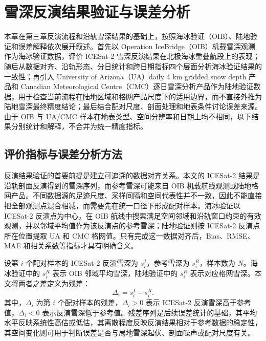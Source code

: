 \cleardoublepage

\section{雪深反演结果验证与误差分析}

本章在第三章反演流程和沿轨雪深结果的基础上，按照海冰验证（OIB）、陆地验证和误差解释依次展开叙述。首先以 Operation IceBridge（OIB）机载雪深观测作为海冰验证数据，评价 ICESat-2 雪深反演结果在北极海冰重叠航段上的表现；随后从数据对齐、沿轨形态、分日统计和跨日期指标四个层面分析海冰验证结果的一致性；再引入 University of Arizona（UA）daily 4 km gridded snow depth 产品和 Canadian Meteorological Centre（CMC）逐日雪深分析产品作为陆地验证数据，用于检查当前流程在陆地区域和格网产品尺度下的适用边界，而不直接外推为陆地雪深最终精度结论；最后结合配对尺度、剖面处理和地表条件讨论误差来源。由于 OIB 与 UA/CMC 样本在地表类型、空间分辨率和日期上均不相同，以下结果分别统计和解释，不合并为统一精度指标。

\subsection{评价指标与误差分析方法}

反演结果验证的首要前提是建立可追溯的数据对齐关系。本文的 ICESat-2 结果是沿轨剖面反演得到的雪深序列，而参考雪深可能来自 OIB 机载航线观测或陆地格网产品。不同数据源的足迹尺度、采样间隔和空间代表性并不一致，因此不能直接把全部观测点混合相减，而需要先在统一口径下形成配对样本。海冰验证以 ICESat-2 反演点为中心，在 OIB 航线中搜索满足空间邻域和沿轨窗口约束的有效观测，并以邻域平均值作为该反演点的参考雪深；陆地验证则按 ICESat-2 反演点所在位置提取 UA 和 CMC 格网值。只有完成这一数据对齐后，Bias、RMSE、MAE 和相关系数等指标才具有明确含义。

设第 \(i\) 个配对样本的 ICESat-2 反演雪深为 \(s_i^{I}\)，参考雪深为 \(s_i^{R}\)，样本数为 \(N\)。海冰验证中的 \(s_i^{R}\) 表示 OIB 邻域平均雪深，陆地验证中的 \(s_i^{R}\) 表示对应格网雪深。本文将两者之差定义为残差：
\begin{equation}
    \Delta_i = s_i^{I} - s_i^{R}.
\end{equation}
其中，\(\Delta_i\) 为第 \(i\) 个配对样本的残差，\(\Delta_i>0\) 表示 ICESat-2 反演雪深高于参考值，\(\Delta_i<0\) 表示反演雪深低于参考值。残差序列是后续误差统计的基础，其平均水平反映系统性高估或低估，其离散程度反映反演结果相对于参考数据的稳定性，其空间变化则可用于判断误差是否与局地雪深起伏、剖面噪声或配对尺度有关。

